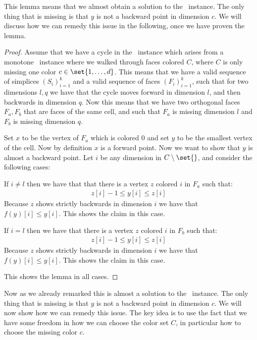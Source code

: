 This lemma means that we almost obtain a solution to the \Tarskistar\ instance. The only thing that is missing is that $y$ is not a backward point in dimension $c$. We will discuss how we can remedy this issue in the following, once we have proven the lemma.

\begin{proof}
	Assume that we have a cycle in the \EndOfLine\ instance which arises from a monotone \Tarskistar\ instance where we walked through faces colored $C$, where $C$ is only missing one color $c \in \set{1, \dots, d}$. This means that we have a valid sequence of simplices ${\left(S_i\right)}_{i=1}^k$ and a valid sequence of faces ${\left(F_i\right)}_{i=1}^k$, such that for two dimensions $l, q$ we have that the cycle moves forward in dimension $l$, and then backwards in dimension $q$. Now this means that we have two orthogonal faces $F_a, F_b$ that are faces of the same cell, and such that $F_a$ is missing dimension $l$ and $F_b$ is missing dimension $q$.

	Set $x$ to be the vertex of $F_a$ which is colored $0$ and set $y$ to be the smallest vertex of the cell. Now by definition $x$ is a forward point. Now we want to show that $y$ is almost a backward point. Let $i$ be any dimension in $C \setminus \set{}$, and consider the following cases:
	\begin{case}{1}
		If $i \neq l$ then we have that that there is a vertex $z$ colored $i$ in $F_a$ such that:
		\begin{align*}
			z[i] - 1 \leq y[i] \leq z[i]
		\end{align*}
		Because $z$ shows strictly backwards in dimension $i$ we have that $f(y)[i] \leq y[i]$. This shows the claim in this case.
	\end{case}
	\begin{case}{2}
		If $i = l$ then we have that there is a vertex $z$ colored $i$ in $F_b$ such that:
		\begin{align*}
			z[i] - 1 \leq y[i] \leq z[i]
		\end{align*}
		Because $z$ shows strictly backwards in dimension $i$ we have that $f(y)[i] \leq y[i]$. This shows the claim in this case.
	\end{case}
	This shows the lemma in all cases.
\end{proof}

Now as we already remarked this is almost a solution to the \Tarskistar\ instance. The only thing that is missing is that $y$ is not a backward point in dimension $c$. We will now show how we can remedy this issue. The key idea is to use the fact that we have some freedom in how we can choose the color set $C$, in particular how to choose the missing color $c$.

